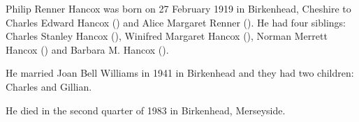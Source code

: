 
Philip Renner Hancox was born on 27 February 1919 in	Birkenhead, Cheshire to Charles Edward Hancox () and Alice Margaret Renner ()\cite{PRHancoxBirth}.  He had four siblings: Charles Stanley Hancox (), Winifred Margaret Hancox (), Norman Merrett Hancox () and Barbara M. Hancox ().

He married Joan Bell Williams in 1941 in Birkenhead \cite{PRHancoxMarriage} and they had two children: Charles and Gillian.

He died in the second quarter of 1983 in Birkenhead, Merseyside.\cite{PRHancoxDeath}



